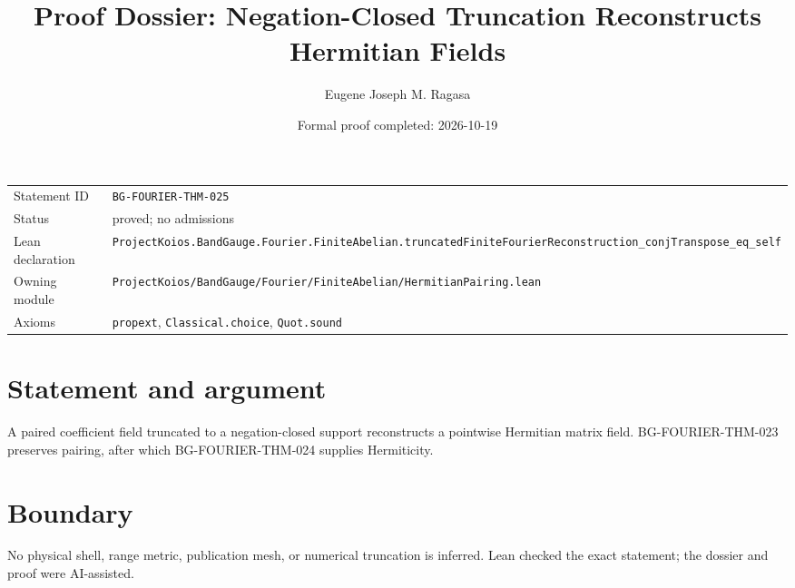 \documentclass[11pt]{article}
\title{Proof Dossier: Negation-Closed Truncation Reconstructs Hermitian Fields}
\author{Eugene Joseph M. Ragasa}
\date{Formal proof completed: 2026-10-19}
\begin{document}
\maketitle
\noindent\begin{tabularx}{\textwidth}{@{}lX@{}}\toprule
Statement ID & \texttt{BG-FOURIER-THM-025} \\
Status & proved; no admissions \\
Lean declaration & \texttt{ProjectKoios.BandGauge.Fourier.FiniteAbelian.}\newline\texttt{truncatedFiniteFourierReconstruction\_conjTranspose\_eq\_self} \\
Owning module & \texttt{ProjectKoios/BandGauge/Fourier/FiniteAbelian/HermitianPairing.lean} \\
Axioms & \texttt{propext}, \texttt{Classical.choice}, \texttt{Quot.sound} \\
\bottomrule\end{tabularx}
\section{Statement and argument}
A paired coefficient field truncated to a negation-closed support reconstructs a pointwise Hermitian matrix field. BG-FOURIER-THM-023 preserves pairing, after which BG-FOURIER-THM-024 supplies Hermiticity.
\section{Boundary}
No physical shell, range metric, publication mesh, or numerical truncation is inferred. Lean checked the exact statement; the dossier and proof were AI-assisted.
\end{document}
